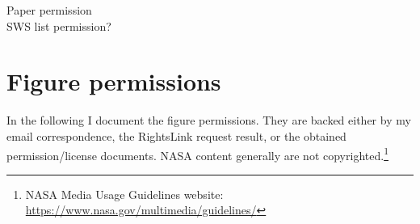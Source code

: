 

Paper permission\\

SWS list permission?\\


\renewcommand\listfigurename{List of Figures and their permissions}
\lofimagetrue
\listoffigures

\section*{Figure permissions}
In the following I document the figure permissions. They are backed either by my email correspondence, the RightsLink request result, or the obtained permission/license documents. NASA content generally are not copyrighted.\footnote{NASA Media Usage Guidelines website: \url{https://www.nasa.gov/multimedia/guidelines/}}

